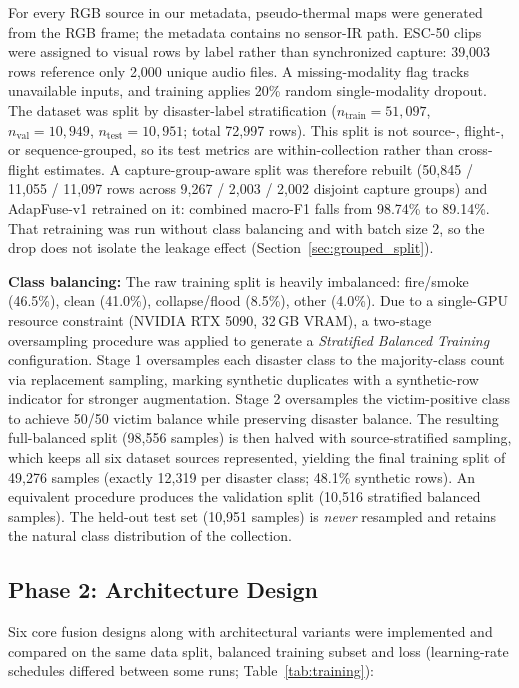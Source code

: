 For every RGB source in our metadata, pseudo-thermal maps were generated from the RGB frame; the metadata contains no sensor-IR path. ESC-50 clips were assigned to visual rows by label rather than synchronized capture: 39{,}003 rows reference only 2{,}000 unique audio files. A missing-modality flag tracks unavailable inputs, and training applies 20\% random single-modality dropout. The dataset was split by disaster-label stratification ($n_\text{train}=51{,}097$, $n_\text{val}=10{,}949$, $n_\text{test}=10{,}951$; total 72{,}997 rows). This split is not source-, flight-, or sequence-grouped, so its test metrics are within-collection rather than cross-flight estimates. A capture-group-aware split was therefore rebuilt (50{,}845 / 11{,}055 / 11{,}097 rows across 9{,}267 / 2{,}003 / 2{,}002 disjoint capture groups) and AdapFuse-v1 retrained on it: combined macro-F1 falls from 98.74\% to 89.14\%. That retraining was run without class balancing and with batch size 2, so the drop does not isolate the leakage effect (Section~\ref{sec:grouped_split}).

\textbf{Class balancing:} The raw training split is heavily imbalanced: fire/smoke (46.5\%), clean (41.0\%), collapse/flood (8.5\%), other (4.0\%). Due to a single-GPU resource constraint (NVIDIA RTX 5090, 32\,GB VRAM), a two-stage oversampling procedure was applied to generate a \textit{Stratified Balanced Training} configuration. Stage 1 oversamples each disaster class to the majority-class count via replacement sampling, marking synthetic duplicates with a synthetic-row indicator for stronger augmentation. Stage 2 oversamples the victim-positive class to achieve 50/50 victim balance while preserving disaster balance. The resulting full-balanced split (98{,}556 samples) is then halved with source-stratified sampling, which keeps all six dataset sources represented, yielding the final training split of 49{,}276 samples (exactly 12{,}319 per disaster class; 48.1\% synthetic rows). An equivalent procedure produces the validation split (10{,}516 stratified balanced samples). The held-out test set (10{,}951 samples) is \emph{never} resampled and retains the natural class distribution of the collection.

\subsection{Phase 2: Architecture Design}

Six core fusion designs along with architectural variants were implemented and compared on the same data split, balanced training subset and loss (learning-rate schedules differed between some runs; Table~\ref{tab:training}):

